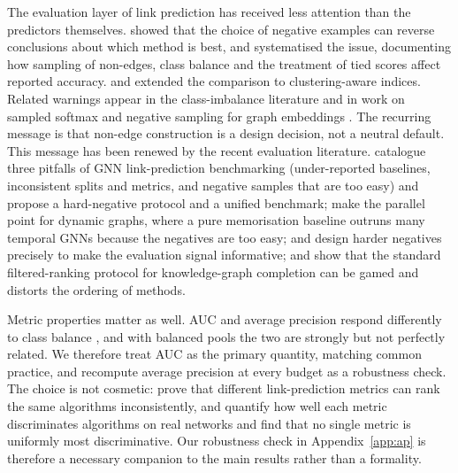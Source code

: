 \documentclass{comjnl}
\begin{document}
The evaluation layer of link prediction has received less attention than the predictors themselves. \citet{lichtenwalter2010new} showed that the choice of negative examples can reverse conclusions about which method is best, and \citet{yang2015evaluating} systematised the issue, documenting how sampling of non-edges, class balance and the treatment of tied scores affect reported accuracy. \citet{wu2016link} and \citet{kumar2019level} extended the comparison to clustering-aware indices. Related warnings appear in the class-imbalance literature \citep{japkowicz2002class} and in work on sampled softmax and negative sampling for graph embeddings \citep{krichene2020sampled}. The recurring message is that non-edge construction is a design decision, not a neutral default. This message has been renewed by the recent evaluation literature. \citet{li2023evaluating} catalogue three pitfalls of GNN link-prediction benchmarking (under-reported baselines, inconsistent splits and metrics, and negative samples that are too easy) and propose a hard-negative protocol and a unified benchmark; \citet{poursafaei2022towards} make the parallel point for dynamic graphs, where a pure memorisation baseline outruns many temporal GNNs because the negatives are too easy; \citet{nguyen2024diffusion} and \citet{islam2022simple} design harder negatives precisely to make the evaluation signal informative; and \citet{tiwari2021revisiting} show that the standard filtered-ranking protocol for knowledge-graph completion can be gamed and distorts the ordering of methods.

Metric properties matter as well. AUC and average precision respond differently to class balance \citep{davis2006relationship,saito2015precision,hand2009measuring,fawcett2006introduction}, and with balanced pools the two are strongly but not perfectly related. We therefore treat AUC as the primary quantity, matching common practice, and recompute average precision at every budget as a robustness check. The choice is not cosmetic: \citet{bi2024inconsistency} prove that different link-prediction metrics can rank the same algorithms inconsistently, and \citet{wan2025quantifying} quantify how well each metric discriminates algorithms on real networks and find that no single metric is uniformly most discriminative. Our robustness check in Appendix~\ref{app:ap} is therefore a necessary companion to the main results rather than a formality.
\end{document}
